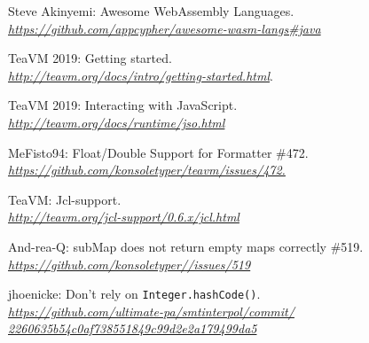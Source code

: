 \documentclass[12pt]{article}
\begin{document}
\medskip

\begin{thebibliography}{9}
Steve Akinyemi: Awesome WebAssembly Languages.
\\\textit{\href{https://github.com/appcypher/awesome-wasm-langs\#java}{https://github.com/appcypher/awesome-wasm-langs\#java}}

TeaVM 2019: Getting started. 
\\\textit{\href{http://teavm.org/docs/intro/getting-started.html}{http://teavm.org/docs/intro/getting-started.html}}.

TeaVM 2019: Interacting with JavaScript.
\\\textit{\href{http://teavm.org/docs/runtime/jso.html}{http://teavm.org/docs/runtime/jso.html}}


MeFisto94: Float/Double Support for Formatter \#472.
\\\textit{\href{https://github.com/konsoletyper/teavm/issues/472}{https://github.com/konsoletyper/teavm/issues/472.}}

TeaVM: Jcl-support.
\\\textit{\href{http://teavm.org/jcl-support/0.6.x/jcl.html}{http://teavm.org/jcl-support/0.6.x/jcl.html}} 

And-rea-Q: subMap does not return empty maps correctly \#519.
\\\textit{\href{https://github.com/konsoletyper/teavm/issues/519}{https://github.com/konsoletyper//issues/519}}

jhoenicke: Don't rely on \verb|Integer.hashCode()|.
\\\textit{\href{https://github.com/ultimate-pa/smtinterpol/commit/2260635b54c0af738551849c99d2e2a179499da5}{https://github.com/ultimate-pa/smtinterpol/commit/
2260635b54c0af738551849c99d2e2a179499da5}}

\end{thebibliography}
\end{document}
